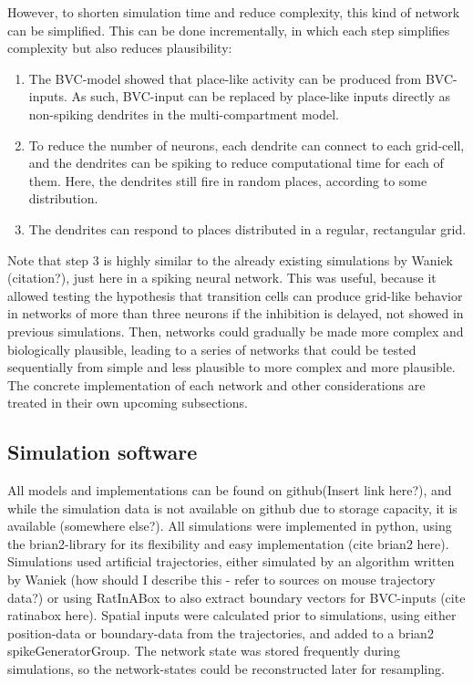 \documentclass{article}
\begin{document}
    However, to shorten simulation time and reduce complexity, this kind of network can be simplified. This can be done incrementally, in which each step simplifies complexity but also reduces plausibility:
    \begin{enumerate}
        \item The BVC-model showed that place-like activity can be produced from BVC-inputs. As such, BVC-input can be replaced by place-like inputs directly as non-spiking dendrites in the multi-compartment model. 
        \item To reduce the number of neurons, each dendrite can connect to each grid-cell, and the dendrites can be spiking to reduce computational time for each of them. Here, the dendrites still fire in random places, according to some distribution.
        \item The dendrites can respond to places distributed in a regular, rectangular grid.
    \end{enumerate}
 
    Note that step 3 is highly similar to the already existing simulations by Waniek (citation?), just here in a spiking neural network. This was useful, because it allowed testing the hypothesis that transition cells can produce grid-like behavior in networks of more than three neurons if the inhibition is delayed, not showed in previous simulations. Then, networks could gradually be made more complex and biologically plausible, leading to a series of networks that could be tested sequentially from simple and less plausible to more complex and more plausible. The concrete implementation of each network and other considerations are treated in their own upcoming subsections.

    \subsection{Simulation software} All models and implementations can be found on github(Insert link here?), and while the simulation data is not available on github due to storage capacity, it is available (somewhere else?). All simulations were implemented in python, using the brian2-library for its flexibility and easy implementation (cite brian2 here). Simulations used artificial trajectories, either simulated by an algorithm written by Waniek (how should I describe this - refer to sources on mouse trajectory data?) or using RatInABox  to also extract boundary vectors for BVC-inputs (cite ratinabox here). Spatial inputs were calculated prior to simulations, using either position-data or boundary-data from the trajectories, and added to a brian2 spikeGeneratorGroup. The network state was stored frequently during simulations, so the network-states could be reconstructed later for resampling. 
\end{document}
